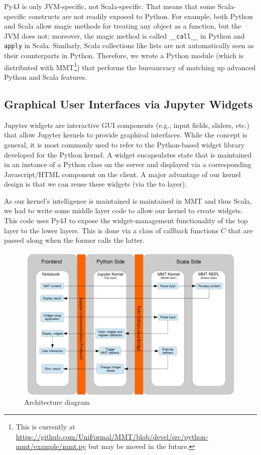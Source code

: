 Py4J is only JVM-specific, not Scala-specific.
That means that some Scala-specific constructs are not readily exposed to Python.
For example, both Python and Scala allow magic methods for treating any object as a function, but the JVM does not; moreover, the magic method is called \texttt{\_\_call\_\_} in Python and \texttt{apply} in Scala.
Similarly, Scala collections like lists are not automatically seen as their counterparts in Python.
Therefore, we wrote a Python module (which is distributed with MMT\footnote{This is currently at \url{https://github.com/UniFormal/MMT/blob/devel/src/python-mmt/example/mmt.py} but may be moved in the future.}) that performs the bureaucracy of matching up advanced Python and Scala features.


\subsection{Graphical User Interfaces via Jupyter Widgets}\label{sec:kernel:widgets}

Jupyter widgets are interactive GUI components (e.g., input fields, sliders, etc.) that allow Jupyter kernels to provide graphical interfaces.
While the concept is general, it is most commonly used to refer to the Python-based widget library developed for the Python kernel.
A widget encapsulates state that is maintained in an instance of a Python class on the server and displayed via a corresponding Javascript/HTML component on the client.
A major advantage of our kernel design is that we can reuse these widgets (via the to layer).

As our kernel's intelligence is maintained is maintained in MMT and thus Scala, we had to write some middle layer code to allow our kernel to create widgets.
This code uses Py4J to expose the widget-management functionality of the top layer to the lower layers.
This is done via a class of callback functions $C$ that are passed along when the former calls the latter.

\begin{figure}[ht]\centering
  \includegraphics[width=12cm]{ArchitectureDiagram}
  \caption{Architecture diagram}\label{fig:architecture-diagram}
\end{figure}

